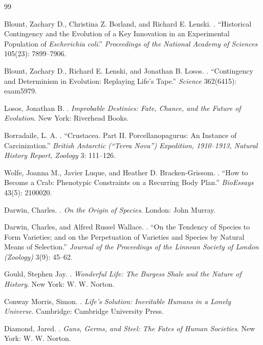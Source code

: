 \documentclass[11pt]{article}
\theoremstyle{plain}
\begin{document}
{\renewcommand{\refname}{}
\begin{thebibliography}{99}

Blount, Zachary D., Christina Z. Borland, and Richard E. Lenski.
.
\newblock ``Historical Contingency and the Evolution of a Key Innovation in an Experimental Population of \emph{Escherichia coli}.''
\newblock \emph{Proceedings of the National Academy of Sciences} 105(23): 7899--7906.

Blount, Zachary D., Richard E. Lenski, and Jonathan B. Losos.
.
\newblock ``Contingency and Determinism in Evolution: Replaying Life's Tape.''
\newblock \emph{Science} 362(6415): eaam5979.

Losos, Jonathan B.
.
\newblock \emph{Improbable Destinies: Fate, Chance, and the Future of Evolution}.
\newblock New York: Riverhead Books.

Borradaile, L. A.
.
\newblock ``Crustacea. Part II. Porcellanopagurus: An Instance of Carcinization.''
\newblock \emph{British Antarctic (``Terra Nova'') Expedition, 1910--1913, Natural History Report, Zoology} 3: 111--126.

Wolfe, Joanna M., Javier Luque, and Heather D. Bracken-Grissom.
.
\newblock ``How to Become a Crab: Phenotypic Constraints on a Recurring Body Plan.''
\newblock \emph{BioEssays} 43(5): 2100020.

Darwin, Charles.
.
\newblock \emph{On the Origin of Species}.
\newblock London: John Murray.

Darwin, Charles, and Alfred Russel Wallace.
.
\newblock ``On the Tendency of Species to Form Varieties; and on the Perpetuation of Varieties and Species by Natural Means of Selection.''
\newblock \emph{Journal of the Proceedings of the Linnean Society of London (Zoology)} 3(9): 45--62.

Gould, Stephen Jay.
.
\newblock \emph{Wonderful Life: The Burgess Shale and the Nature of History}.
\newblock New York: W. W. Norton.

Conway Morris, Simon.
.
\newblock \emph{Life's Solution: Inevitable Humans in a Lonely Universe}.
\newblock Cambridge: Cambridge University Press.

Diamond, Jared.
.
\newblock \emph{Guns, Germs, and Steel: The Fates of Human Societies}.
\newblock New York: W. W. Norton.


\end{thebibliography}}
\end{document}
